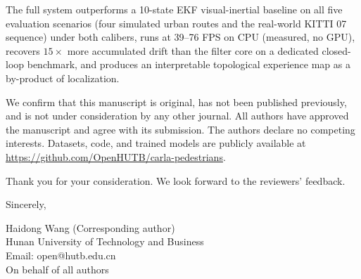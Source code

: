 \documentclass[11pt]{article}
\begin{document}
\vspace{0.6em}

The full system outperforms a 10-state EKF visual-inertial baseline on all five evaluation scenarios (four simulated urban routes and the real-world KITTI 07 sequence) under both calibers, runs at 39--76 FPS on CPU (measured, no GPU), recovers $15\times$ more accumulated drift than the filter core on a dedicated closed-loop benchmark, and produces an interpretable topological experience map as a by-product of localization.

\vspace{0.8em}

We confirm that this manuscript is original, has not been published previously, and is not under consideration by any other journal. All authors have approved the manuscript and agree with its submission. The authors declare no competing interests. Datasets, code, and trained models are publicly available at \url{https://github.com/OpenHUTB/carla-pedestrians}.

\vspace{0.8em}

Thank you for your consideration. We look forward to the reviewers' feedback.

\vspace{1.5em}

\noindent Sincerely,

\vspace{1.5em}

\noindent Haidong Wang (Corresponding author)\\
Hunan University of Technology and Business\\
Email: open@hutb.edu.cn\\
On behalf of all authors
\end{document}
